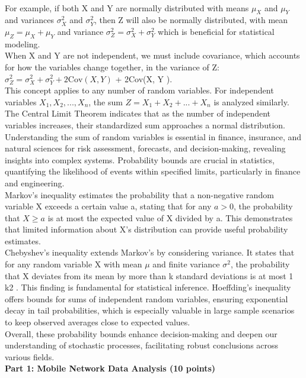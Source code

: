 \documentclass[a3paper,12pt]{extarticle} %
\begin{document}
    \\ For example, if both X and Y are normally distributed with means \(\mu_X\) and \(\mu_Y\) and variances \(\sigma^2_X\) and \(\sigma^2_Y\), then Z will also be normally distributed, with mean \(\mu_Z = \mu_X + \mu_Y\) and variance \(\sigma^2_Z = \sigma^2_X + \sigma^2_Y\)
    which is beneficial for statistical modeling.
    \\ When X and Y are not independent, we must include covariance, which accounts for how the variables
    change together, in the variance of Z: \(\sigma^2_Z = \sigma^2_X + \sigma^2_Y + 2\text{Cov}(X, Y)\)
    + 2Cov(X, Y ).
    \\ This concept applies to any number of random variables. For independent variables \(X_1,X_2, . . . ,X_n\), the
    sum \(Z = X_1 + X_2 + . . . + X_n\) is analyzed similarly. The Central Limit Theorem indicates that as the
    number of independent variables increases, their standardized sum approaches a normal distribution.
    Understanding the sum of random variables is essential in finance, insurance, and natural sciences for
    risk assessment, forecasts, and decision-making, revealing insights into complex systems.
    Probability bounds are crucial in statistics, quantifying the likelihood of events within specified limits,
    particularly in finance and engineering.
    \\ Markov’s inequality estimates the probability that a non-negative random variable X exceeds a certain
    value a, stating that for any \(a > 0\), the probability that \(X \geq a\) is at most the expected value of X divided
    by a. This demonstrates that limited information about X’s distribution can provide useful probability
    estimates.
    \\ Chebyshev’s inequality extends Markov’s by considering variance. It states that for any random variable
    X with mean \(\mu\) and finite variance \(\sigma^2\), the probability that X deviates from its mean by more than k
    standard deviations is at most 1
    k2 . This finding is fundamental for statistical inference.
    Hoeffding’s inequality offers bounds for sums of independent random variables, ensuring exponential
    decay in tail probabilities, which is especially valuable in large sample scenarios to keep observed averages
    close to expected values.
    \\ Overall, these probability bounds enhance decision-making and deepen our understanding of stochastic
    processes, facilitating robust conclusions across various fields.
    \\ \subitem \textbf{Part 1: Mobile Network Data Analysis (10 points)}
\end{document}
